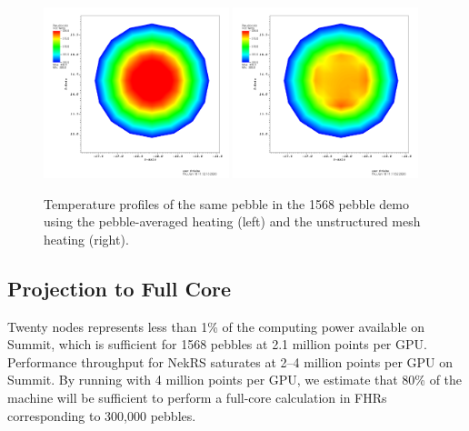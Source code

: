 \begin{figure}[!h]
\centering
\includegraphics[clip=true,width=0.48\textwidth]{Figures/openmc_cell_temperature_zoomed}
\includegraphics[clip=true,width=0.48\textwidth]{Figures/openmc_mesh_temperature_zoomed}
\caption{Temperature profiles of the same pebble in the 1568 pebble demo using
the pebble-averaged heating (left) and the unstructured mesh heating (right).}
\label{f:1568_openmc_temperatures_single_pebble}
\end{figure}

\subsection{Projection to Full Core}

Twenty nodes represents less than 1\% of the computing power available on
Summit, which is sufficient for 1568 pebbles at 2.1 million points per
GPU.  Performance throughput for NekRS saturates at 2--4 million points
per GPU on Summit.  By running with 4 million points per GPU, we estimate that
80\% of the machine will be sufficient to perform a full-core calculation in
FHRs corresponding to 300,000 pebbles.

